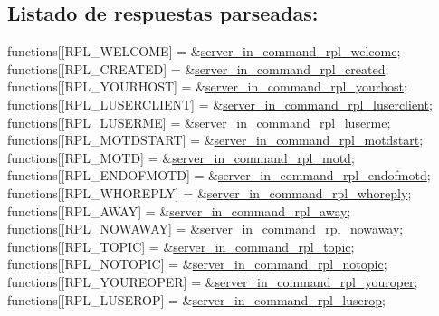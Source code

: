 \subsection*{Listado de respuestas parseadas\+:}


\begin{DoxyCode}
functions[[RPL\_WELCOME]      = &\hyperlink{G-2313-06-P2__client__function__handlers_8h_a294ef5e5070e9859d88beb603ef950f2}{server\_in\_command\_rpl\_welcome};
functions[[RPL\_CREATED]      = &\hyperlink{G-2313-06-P2__client__function__handlers_8h_a40e46db4017fb76fc547536d9c51f5d9}{server\_in\_command\_rpl\_created};
functions[[RPL\_YOURHOST]     = &\hyperlink{G-2313-06-P2__client__function__handlers_8h_a3f4cf6c0d74b06a0916f7a9619972eee}{server\_in\_command\_rpl\_yourhost};
functions[[RPL\_LUSERCLIENT]  = &\hyperlink{G-2313-06-P2__client__function__handlers_8h_af5091cf59cbab7ce259c405c019fa8dd}{server\_in\_command\_rpl\_luserclient};
functions[[RPL\_LUSERME]      = &\hyperlink{G-2313-06-P2__client__function__handlers_8h_a5764225aa28906c7ccebf0996b2c5a08}{server\_in\_command\_rpl\_luserme};
functions[[RPL\_MOTDSTART]    = &\hyperlink{G-2313-06-P2__client__function__handlers_8h_acd688f18855dcb6ee9bf10a72e0c8f6c}{server\_in\_command\_rpl\_motdstart};
functions[[RPL\_MOTD]         = &\hyperlink{G-2313-06-P2__client__function__handlers_8h_a774c98f4ea94eb6f92a5b22d33030674}{server\_in\_command\_rpl\_motd};
functions[[RPL\_ENDOFMOTD]    = &\hyperlink{G-2313-06-P2__client__function__handlers_8h_ad22233e08c30cad9e0598f80b5b38744}{server\_in\_command\_rpl\_endofmotd};
functions[[RPL\_WHOREPLY]     = &\hyperlink{G-2313-06-P2__client__function__handlers_8h_a86782df5d9b151dd061b9831a47a2c5f}{server\_in\_command\_rpl\_whoreply};
functions[[RPL\_AWAY]         = &\hyperlink{G-2313-06-P2__client__function__handlers_8h_add282510a7e92a90d45091e6dc3a3488}{server\_in\_command\_rpl\_away};
functions[[RPL\_NOWAWAY]      = &\hyperlink{G-2313-06-P2__client__function__handlers_8h_ada377e1754f9a22a2ebe0bada8838b5b}{server\_in\_command\_rpl\_nowaway};
functions[[RPL\_TOPIC]        = &\hyperlink{G-2313-06-P2__client__function__handlers_8h_abc030e3bc9ce4ad126ea2c66e304e2d5}{server\_in\_command\_rpl\_topic};
functions[[RPL\_NOTOPIC]      = &\hyperlink{G-2313-06-P2__client__function__handlers_8h_ab9b55bd1e18bde61e8327fcf6936d91f}{server\_in\_command\_rpl\_notopic};
functions[[RPL\_YOUREOPER]    = &\hyperlink{G-2313-06-P2__client__function__handlers_8h_a24bb76a5941798964a8dd18e1cfb1d81}{server\_in\_command\_rpl\_youroper};
functions[[RPL\_LUSEROP]      = &\hyperlink{G-2313-06-P2__client__function__handlers_8h_aa885b5d729d8a920a1c38678abdbe6b7}{server\_in\_command\_rpl\_luserop};

\end{DoxyCode}
